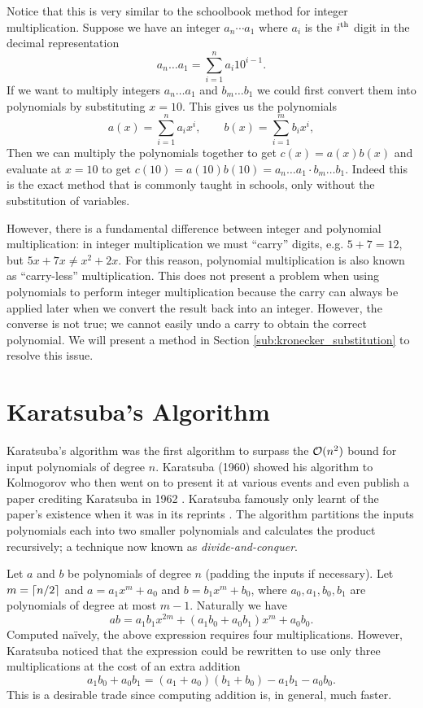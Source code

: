 Notice that this is very similar to the schoolbook method for integer multiplication. Suppose we have an integer $a_n \cdots a_1$ where $a_i$ is the $i^\textrm{th}$ digit in the decimal representation
\[
    a_n \ldots a_1 = \sum^n_{i=1} a_i 10^{i-1}.
\]
If we want to multiply integers $a_n\ldots a_1$ and $b_m\ldots b_1$ we could first convert them into polynomials by substituting $x = 10$. This gives us the polynomials
\[
    a(x) = \sum^n_{i=1} a_ix^i, \qquad b(x) = \sum^m_{i=1} b_ix^i,
\]
Then we can multiply the polynomials together to get $c(x) = a(x)b(x)$ and evaluate at $x = 10$ to get $c(10) = a(10)b(10) = a_n\ldots a_1 \cdot b_m\ldots b_1$. Indeed this is the exact method that is commonly taught in schools, only without the substitution of variables.

However, there is a fundamental difference between integer and polynomial multiplication: in integer multiplication we must ``carry'' digits, e.g. $5 + 7 = 12$, but $5x + 7x \neq x^2 + 2x$. For this reason, polynomial multiplication is also known as ``carry-less'' multiplication. This does not present a problem when using polynomials to perform integer multiplication because the carry can always be applied later when we convert the result back into an integer. However, the converse is not true; we cannot easily undo a carry to obtain the correct polynomial. We will present a method in Section \ref{sub:kronecker_substitution} to resolve this issue.

\section{Karatsuba's Algorithm}
\label{sec:prelim-karatsuba}

Karatsuba's algorithm was the first algorithm to surpass the $\mathcal O(n^2)$ bound for input polynomials of degree $n$. Karatsuba (1960) showed his algorithm to Kolmogorov who then went on to present it at various events and even publish a paper crediting Karatsuba in 1962 \cite{karatsuba}. Karatsuba famously only learnt of the paper's existence when it was in its reprints \cite{karatsuba1995}. The algorithm partitions the inputs polynomials each into two smaller polynomials and calculates the product recursively; a technique now known as \emph{divide-and-conquer}. 

Let $a$ and $b$ be polynomials of degree $n$ (padding the inputs if necessary). Let $m = \left \lceil n/2 \right \rceil$ and $a = a_1x^m + a_0$ and $b = b_1x^m + b_0$, where $a_0, a_1, b_0, b_1$ are polynomials of degree at most $m - 1$. Naturally we have
\[
    ab = a_1b_1x^{2m} + (a_1b_0 + a_0b_1)x^m + a_0b_0.
\]
Computed na\"{i}vely, the above expression requires four multiplications. However, Karatsuba noticed that the expression could be rewritten to use only three multiplications at the cost of an extra addition 
\[
    a_1b_0 + a_0b_1 = (a_1 + a_0)(b_1 + b_0) - a_1b_1 - a_0b_0.
\]
This is a desirable trade since computing addition is, in general, much faster.


